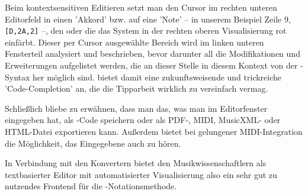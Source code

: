 Beim kontextsensitiven Editieren setzt man den Cursor im rechten unteren
Editorfeld in einen 'Akkord' bzw. auf eine 'Note' -- in unserem Beispiel Zeile
9, \texttt{[D,2A,2]} --, den oder die das System in der rechten oberen
Visualisierung rot einfärbt. Dieser per Cursor ausgewählte Bereich wird im
linken unteren Fensterteil analysiert und beschrieben, bevor darunter all die
Modifikationen und Erweiterungen aufgelistet werden, die an dieser Stelle in
diesem Kontext von der -Syntax her möglich sind.  bietet
damit eine zukunftsweisende und trickreiche 'Code-Completion' an, die die
Tipparbeit wirklich zu vereinfach vermag.

Schließlich bliebe zu erwähnen, dass man das, was man im Editorfenster
eingegeben hat, als -Code speichern oder als PDF-, MIDI, MusicXML- oder
HTML-Datei exportieren kann. Außerdem bietet  bei gelungener
MIDI-Integration die Möglichkeit, das Eingegebene auch zu hören.

In Verbindung mit den Konvertern bietet  den Musikwissenschaftlern
als textbasierter Editor mit automatisierter Visualisierung also ein sehr gut zu
nutzendes Frontend für die -Notationsmethode.

%
